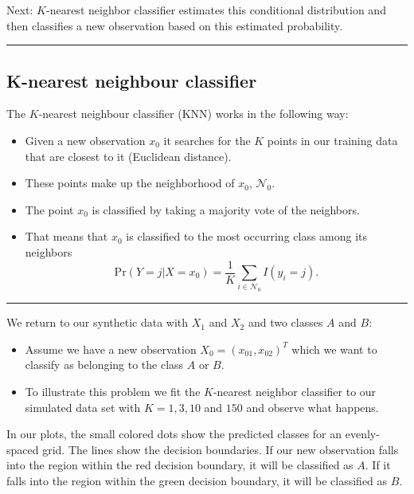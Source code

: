 \documentclass[]{article}
\providecommand{\tightlist}{%
  \setlength{\itemsep}{0pt}\setlength{\parskip}{0pt}}
\begin{document}
Next: \(K\)-nearest neighbor classifier estimates this conditional
distribution and then classifies a new observation based on this
estimated probability.

\begin{center}\rule{0.5\linewidth}{\linethickness}\end{center}

\hypertarget{k-nearest-neighbour-classifier}{%
\subsection{K-nearest neighbour
classifier}\label{k-nearest-neighbour-classifier}}

The \(K\)-nearest neighbour classifier (KNN) works in the following way:

\begin{itemize}
\tightlist
\item
  Given a new observation \(x_0\) it searches for the \(K\) points in
  our training data that are closest to it (Euclidean distance).
\item
  These points make up the neighborhood of \(x_0\), \(\mathcal{N}_0\).
\item
  The point \(x_0\) is classified by taking a majority vote of the
  neighbors.
\item
  That means that \(x_0\) is classified to the most occurring class
  among its neighbors
  \[\text{Pr}(Y=j | X = x_0) = \frac{1}{K} \sum_{i \in \mathcal{N}_0} I(y_i = j).\]
\end{itemize}

\begin{center}\rule{0.5\linewidth}{\linethickness}\end{center}

We return to our synthetic data with \(X_1\) and \(X_2\) and two classes
\(A\) and \(B\):

\begin{itemize}
\tightlist
\item
  Assume we have a new observation \(X_0 = (x_{01}, x_{02})^T\) which we
  want to classify as belonging to the class \(A\) or \(B\).
\item
  To illustrate this problem we fit the \(K\)-nearest neighbor
  classifier to our simulated data set with \(K = 1, 3, 10\) and \(150\)
  and observe what happens.
\end{itemize}

In our plots, the small colored dots show the predicted classes for an
evenly-spaced grid. The lines show the decision boundaries. If our new
observation falls into the region within the red decision boundary, it
will be classified as \(A\). If it falls into the region within the
green decision boundary, it will be classified as \(B\).
\end{document}
